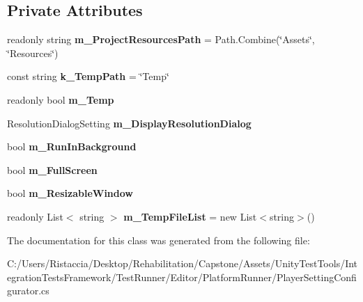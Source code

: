 \subsection*{Private Attributes}
\begin{DoxyCompactItemize}
\item 
\mbox{\label{class_unity_test_1_1_player_setting_configurator_a66183378ad0abbea818d444cf9902a91}} 
readonly string {\bfseries m\+\_\+\+Project\+Resources\+Path} = Path.\+Combine(\char`\"{}Assets\char`\"{}, \char`\"{}Resources\char`\"{})
\item 
\mbox{\label{class_unity_test_1_1_player_setting_configurator_af33706fdc58d3f2d6269b27fcb58c259}} 
const string {\bfseries k\+\_\+\+Temp\+Path} = \char`\"{}Temp\char`\"{}
\item 
\mbox{\label{class_unity_test_1_1_player_setting_configurator_a37bc5996a19e387aefd66f0535fe89a2}} 
readonly bool {\bfseries m\+\_\+\+Temp}
\item 
\mbox{\label{class_unity_test_1_1_player_setting_configurator_a4491d31dd6605143b52600e99b86f7ac}} 
Resolution\+Dialog\+Setting {\bfseries m\+\_\+\+Display\+Resolution\+Dialog}
\item 
\mbox{\label{class_unity_test_1_1_player_setting_configurator_aff09df4a3927652e204b8bfba4587c22}} 
bool {\bfseries m\+\_\+\+Run\+In\+Background}
\item 
\mbox{\label{class_unity_test_1_1_player_setting_configurator_a246bb986f1452aca4c6308384ec7db8f}} 
bool {\bfseries m\+\_\+\+Full\+Screen}
\item 
\mbox{\label{class_unity_test_1_1_player_setting_configurator_a67ee2d535dd7bca57192f2b2bdd010f1}} 
bool {\bfseries m\+\_\+\+Resizable\+Window}
\item 
\mbox{\label{class_unity_test_1_1_player_setting_configurator_ad4ab8d824fa0bcfed53e35210c7d6f33}} 
readonly List$<$ string $>$ {\bfseries m\+\_\+\+Temp\+File\+List} = new List$<$string$>$()
\end{DoxyCompactItemize}


The documentation for this class was generated from the following file\+:\begin{DoxyCompactItemize}
\item 
C\+:/\+Users/\+Ristaccia/\+Desktop/\+Rehabilitation/\+Capstone/\+Assets/\+Unity\+Test\+Tools/\+Integration\+Tests\+Framework/\+Test\+Runner/\+Editor/\+Platform\+Runner/Player\+Setting\+Configurator.\+cs\end{DoxyCompactItemize}
